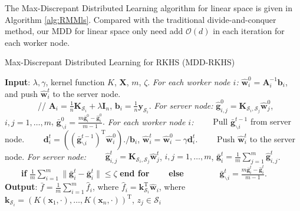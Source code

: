 \documentclass{article}
\begin{document}
The Max-Discrepant Distributed Learning  algorithm for linear space is given in Algorithm \ref{alg:RMMls}.
Compared with the traditional divide-and-conquer method,
our MDD for linear space only need add $\mathcal{O}(d)$ in each iteration for each worker node.
\begin{algorithm}
    \caption{Max-Discrepant Distributed Learning for RKHS (MDD-RKHS)}
    \label{alg:RMMRKHS}
    \begin{algorithmic}[1]
    \STATE \textbf{Input}: $\lambda,\gamma$, kernel function $K$, $\mathbf X$, $m$, $\zeta$.
     \STATE \emph{For each worker node $i$:} $\hat{\mathbf w}_i^0=\mathbf A_i^{-1} \mathbf b_i$, and push $\hat{\mathbf w}_i^t$ to the server node.\\
            ~~~~~~~~// $\mathbf A_i=\frac{1}{n}\mathbf K_{\mathcal{S}_i}+
            \lambda \mathbf I_n$, $\mathbf b_i= \frac{1}{n}\mathbf y_{\mathcal{S}_i}$.
    \STATE \emph{For server node:} $\hat{\mathbf g}_{i,j}^0=\mathbf K_{\mathcal{S}_i,\mathcal{S}_j}\hat{\mathbf w}_j^0$, $i, j=1,\ldots,m$, $\bar{\mathbf g}^{0}_{\backslash i}=\frac{m\bar{\mathbf g}_i^{0}-\hat{\mathbf g}_i^0}{m-1}$.
    \STATE  \emph{For each worker node $i$:}
    \STATE ~~~~Pull $\bar{\mathbf g}^{t-1}_{\backslash i}$ from server node.
    \STATE ~~~~$\mathbf d_i^t=\left(\left(\bar{\mathbf g}^{t-1}_{\backslash i}\right)^\mathrm{T}\hat{\mathbf w}_i^0\right)./\mathbf b_i$,
     $\hat{\mathbf w}_i^t=\hat{\mathbf w}_i^0-\gamma\mathbf d_i^t$.
    \STATE ~~~~Push $\hat{\mathbf w}_i^t$ to the server node.
     \STATE \emph{For server node:}
     \STATE ~~~~$\hat{\mathbf g}_{i,j}^{t}=\mathbf K_{\mathcal{S}_i,\mathcal{S}_j}\hat{\mathbf w}_j^t$, $i, j=1,\ldots,m$,
     $\bar{\mathbf g}_{i}^t=\frac{1}{m}\sum_{j=1}^m \hat{\mathbf g}_{i,j}^t$.\\
      ~~~~\textbf{if} {$\frac{1}{m}\sum_{i=1}^m\|\bar{\mathbf g}_i^{t}-\bar{\mathbf g}_i^{t}\|\leq \zeta$} \textbf{end for}
      \STATE ~~~~\textbf{else}
      \STATE ~~~~~~~~$\bar{\mathbf g}^{t}_{\backslash i}=\frac{m\bar{\mathbf g}_i^{t}-\hat{\mathbf g}_i^t}{m-1}$.
    \ENDFOR
    \STATE \textbf{Output}: $\bar{f}=\frac{1}{m}\sum_{i=1}^m\hat{f}_i$, where $\hat{f}_i=\mathbf k_{\mathcal{S}_i}^\mathrm{T}\hat{\mathbf w}_i$,
    where $\mathbf k_{\mathcal{S}_i}=(K(\mathbf x_1,\cdot),\ldots,K(\mathbf x_n,\cdot))^\mathrm{T}$, $z_j\in\mathcal{S}_i$
    \end{algorithmic}
\end{algorithm}
\end{document}
